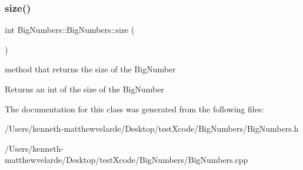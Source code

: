 \subsubsection{\texorpdfstring{size()}{size()}}
{\footnotesize\ttfamily int Big\+Numbers\+::\+Big\+Numbers\+::size (\begin{DoxyParamCaption}{ }\end{DoxyParamCaption})}



method that returns the size of the Big\+Number 

\begin{DoxyReturn}{Returns}
an int of the size of the Big\+Number 
\end{DoxyReturn}


The documentation for this class was generated from the following files\+:\begin{DoxyCompactItemize}
\item 
/\+Users/kenneth-\/matthewvelarde/\+Desktop/test\+Xcode/\+Big\+Numbers/Big\+Numbers.\+h\item 
/\+Users/kenneth-\/matthewvelarde/\+Desktop/test\+Xcode/\+Big\+Numbers/Big\+Numbers.\+cpp\end{DoxyCompactItemize}
